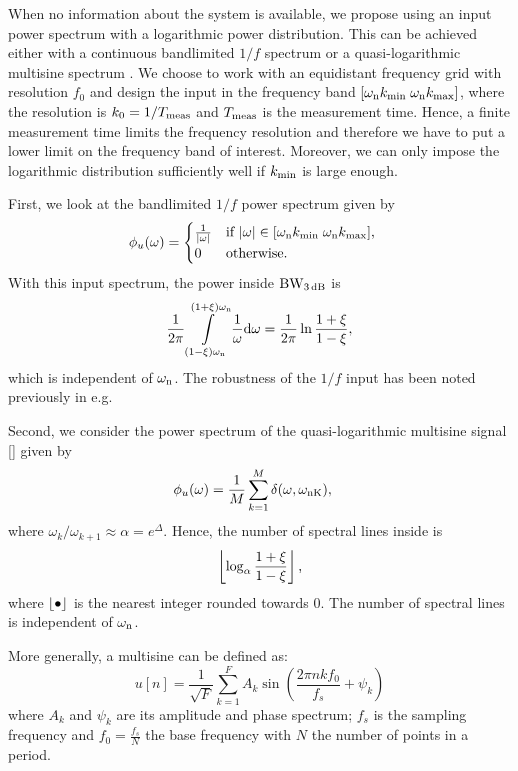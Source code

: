 When no information about the system is available, we propose using an input power spectrum with a logarithmic power distribution. This can be achieved either with a continuous bandlimited $1/f$ spectrum or a quasi-logarithmic multisine spectrum \citep{Pintelon2012}. 
We choose to work with an equidistant frequency grid with resolution $f_0$ and design the input in the frequency band $[\wn \kMin\; \wn \kMax]$, where the resolution is $k_0=1/\Tm$ and $\Tm$ is the measurement time. Hence, a finite measurement time limits the frequency resolution and therefore we have to put a lower limit on the frequency band of interest. Moreover, we can only impose the logarithmic distribution sufficiently well if $\kMin$ is large enough.

First, we look at the bandlimited $1/f$ power spectrum given by
\begin{align*}
\label{eq:pink}
\phi_u(\omega) &=\begin{cases}\frac{1}{|\omega|} &\text{if $|\omega|\in[\wn \kMin\; \wn \kMax]$,}\\
                        0           &\text{otherwise}.
            \end{cases}
\end{align*}
With this input spectrum, the power inside $\wdB$ is
\begin{align}
  \frac{1}{2\pi}
    \int\limits_{(1-\damping)\wn}^{(1+\damping)\wn}
     \frac{1}{\omega} \dd{\omega}
  = \frac{1}{2\pi}
    \ln{\frac{1+\damping}{1-\damping}},
\end{align}
which is independent of $\wn$. The robustness of the $1/f$ input has been noted previously in e.g. \cite{Rojas2007}

Second, we consider the power spectrum of the quasi-logarithmic multisine signal [\cite{Pintelon2012}] given by
\begin{align}
  \phi_u(\omega) &= \frac{1}{M}\sum_{k=1}^{M}{\delta(\omega,\wn[K])},
\end{align}
where $\omega_{k}/\omega_{k+1} \approx \alpha = e^{\Delta}$.
Hence, the number of spectral lines inside \wdB is 
\begin{align}
  \floor{
    \log_{\alpha} \frac{1+\damping}{1-\damping} 
  }
  \text{,}
\end{align}
where $\floor{\placeholder}$ is the nearest integer rounded towards $0$. The number of spectral lines is independent of $\wn$. 

More generally, a multisine can be defined as:
\begin{equation}
 u \left[ n\right] = \frac{1}{\sqrt{F}}
   \sum_{k=1}^{F} 
     A_k 
     \sin 
       \left(\frac{2\pi n k f_0}{f_s} + \psi_k \right)
  \label{eq:MS}
\end{equation}
where $A_k$ and $\psi_k$ are its amplitude and phase spectrum; $f_s$ is the
sampling frequency and $f_0 = \frac{f_s}{N}$ the base frequency with $N$ the 
number of points in a period. 

